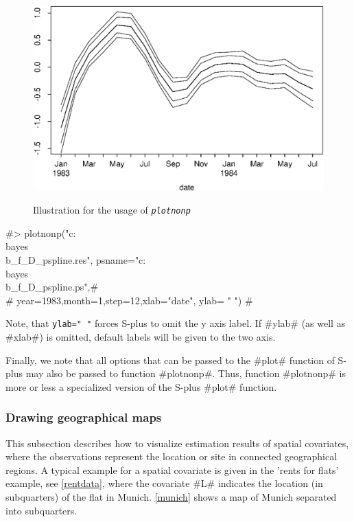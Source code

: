 \begin{figure}[ht]
\begin{center}
\includegraphics[scale=0.8]{grafiken/plotnonpdate.eps}
{\em\caption{ \label{illgraph2} Illustration for the usage of
\em\tt plotnonp}}
\end{center}
\end{figure}

#> plotnonp("c:\\bayes\\b_f_D_pspline.res", psname="c:\\bayes\\b_f_D_pspline.ps",#\\
#  year=1983,month=1,step=12,xlab="date", ylab= " ") #

Note, that \texttt{ylab=" "} forces S-plus to omit the y axis
label. If #ylab# (as well as #xlab#) is omitted, default labels
will be given to the two axis.

Finally, we note that all options that can be passed to the #plot#
function of S-plus may also be passed to function #plotnonp#.
Thus, function #plotnonp# is more or less a specialized version of
the S-plus #plot# function.


\subsubsection{Drawing geographical maps}
 

This subsection describes how to visualize estimation results of
spatial covariates, where the observations represent the location
or site in connected geographical regions. A typical example for a
spatial covariate is given in the 'rents for flats' example, see
\autoref{rentdata}, where the covariate #L# indicates the location
(in subquarters) of the flat in Munich. \autoref{munich} shows a
map of Munich separated into subquarters.

